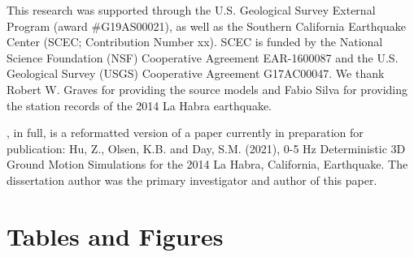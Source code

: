 This research was supported through the U.S. Geological Survey External Program (award \#G19AS00021), as well as the Southern California Earthquake Center (SCEC; Contribution Number xx). SCEC is funded by the National Science Foundation (NSF) Cooperative Agreement EAR-1600087 and the U.S. Geological Survey (USGS) Cooperative Agreement G17AC00047. We thank Robert W. Graves for providing the source models and Fabio Silva for providing the station records of the 2014 La Habra earthquake.

, in full, is a reformatted version of a paper currently in preparation for publication: Hu, Z., Olsen, K.B. and Day, S.M. (2021), 0-5 Hz Deterministic 3D Ground Motion Simulations for the 2014 La Habra, California, Earthquake. The dissertation author was the primary investigator and author of this paper.

\newpage
\section*{Tables and Figures}
%


